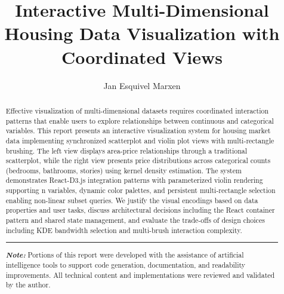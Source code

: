 \documentclass[sigplan,screen]{acmart}
\begin{document}
\title{Interactive Multi-Dimensional Housing Data Visualization with Coordinated Views}


\author{Jan Esquivel Marxen}

\renewcommand{\shortauthors}{Marxen}

\begin{abstract}
  Effective visualization of multi-dimensional datasets requires
  coordinated interaction patterns that enable users to explore
  relationships between continuous and categorical variables.
  This report presents an interactive visualization system for
  housing market data implementing synchronized scatterplot and
  violin plot views with multi-rectangle brushing. The left view
  displays area-price relationships through a traditional
  scatterplot, while the right view presents price distributions
  across categorical counts (bedrooms, bathrooms, stories) using
  kernel density estimation. The system demonstrates React-D3.js
  integration patterns with parameterized violin rendering
  supporting n variables, dynamic color palettes, and persistent
  multi-rectangle selection enabling non-linear subset queries.
  We justify the visual encodings based on data properties and
  user tasks, discuss architectural decisions including the React
  container pattern and shared state management, and evaluate the
  trade-offs of design choices including KDE bandwidth selection
  and multi-brush interaction complexity.
\smallskip
\noindent\rule{\linewidth}{0.4pt}
\textit{\textbf{Note:}} Portions of this report were developed with
the assistance of artificial intelligence tools to support code
generation, documentation, and readability improvements. All technical
content and implementations were reviewed and validated by the author.

\end{abstract}
\end{document}
